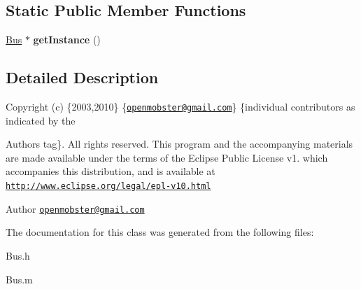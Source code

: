 \subsection*{\-Static \-Public \-Member \-Functions}
\begin{DoxyCompactItemize}
\item 
\hypertarget{interface_bus_a0cc500e1b89b361e1b3b37f679071ac3}{
\hyperlink{interface_bus}{\-Bus} $\ast$ {\bfseries get\-Instance} ()}
\label{interface_bus_a0cc500e1b89b361e1b3b37f679071ac3}

\end{DoxyCompactItemize}


\subsection{\-Detailed \-Description}
\-Copyright (c) \{2003,2010\} \{\href{mailto:openmobster@gmail.com}{\tt openmobster@gmail.\-com}\} \{individual contributors as indicated by the \begin{DoxyAuthor}{\-Authors}
tag\}. \-All rights reserved. \-This program and the accompanying materials are made available under the terms of the \-Eclipse \-Public \-License v1. which accompanies this distribution, and is available at \href{http://www.eclipse.org/legal/epl-v10.html}{\tt http\-://www.\-eclipse.\-org/legal/epl-\/v10.\-html}
\end{DoxyAuthor}
\begin{DoxyAuthor}{\-Author}
\href{mailto:openmobster@gmail.com}{\tt openmobster@gmail.\-com} 
\end{DoxyAuthor}


\-The documentation for this class was generated from the following files\-:\begin{DoxyCompactItemize}
\item 
\-Bus.\-h\item 
\-Bus.\-m\end{DoxyCompactItemize}
